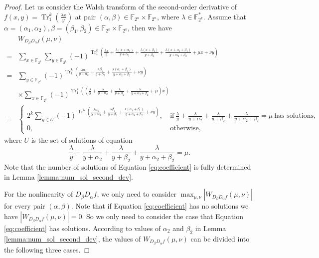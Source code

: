 \documentclass{article}
\newcommand{\F}{\mathbb{F}}
\newcommand{\0}{\textbf{0}}
\newcommand{\1}{\textbf{1}}
\newcommand{\TRACE}{\operatorname{Tr}_1^k}
\theoremstyle{plain}
\begin{document}
    \begin{proof}
        Let us consider the Walsh transform of the second-order derivative of $f(x,y)=\TRACE\left(\frac{\lambda x}{y}\right)$ at
        pair $(\alpha, \beta)\in\F_{2^n}\times\F_{2^n}$, where $\lambda\in\F_{2^k}^*$.
        Assume that $\alpha=(\alpha_1,\alpha_2),\beta=(\beta_1,\beta_2)\in\F_{2^k}\times\F_{2^k}$, then
        we have
        \begin{align*}\label{eq:secondordersum}
            &W_{D_{\beta}D_{\alpha}f}(\mu,\nu)\nonumber\\
            =&\sum_{x\in\F_{2^k}}\sum_{y\in\F_{2^k}}(-1)^{\TRACE\left(\frac{\lambda x}{y}+\frac{\lambda (x+\alpha_1)}{y+\alpha_2}+\frac{\lambda (x+\beta_1)}{y+\beta_2}+\frac{\lambda (x+\alpha_1+\beta_1)}{y+\alpha_2+\beta_2}+\mu x+\nu y\right)}\nonumber\\
            =&\sum_{y\in\F_{2^k}}(-1)^{\TRACE\left(\frac{\lambda\alpha_1}{y+\alpha_2}+\frac{\lambda\beta_1}{y+\beta_2}+\frac{\lambda(\alpha_1+\beta_1)}{y+\alpha_2+\beta_2}+\nu y\right)}\nonumber\\
            &\times \sum_{x\in\F_{2^k}}(-1)^{\TRACE\left(\left(\frac{\lambda}{y}+\frac{\lambda}{y+\alpha_2}+\frac{\lambda}{y+\beta_2}+\frac{\lambda}{y+\alpha_2+\beta_2}+\mu\right)x\right)}\nonumber\\
            =&\begin{cases}
                2^k\sum_{y\in U}(-1)^{\TRACE\left(\frac{\lambda\alpha_1}{y+\alpha_2}+\frac{\lambda\beta_1}{y+\beta_2}+\frac{\lambda(\alpha_1+\beta_1)}{y+\alpha_2+\beta_2}+\nu y\right)},&~\text{if}~\frac{\lambda}{y}+\frac{\lambda}{y+\alpha_2}+\frac{\lambda}{y+\beta_2}+\frac{\lambda}{y+\alpha_2+\beta_2}=\mu~\text{has solutions},\\
                0, &~\text{otherwise},
            \end{cases}
        \end{align*}
        where $U$ is the set of solutions of equation
        \begin{equation}\label{eq:coefficient}
            \frac{\lambda}{y}+\frac{\lambda}{y+\alpha_2}+\frac{\lambda}{y+\beta_2}+\frac{\lambda}{y+\alpha_2+\beta_2}=\mu.
        \end{equation}
        Note that the number of solutions of Equation \eqref{eq:coefficient} is fully determined in Lemma \ref{lemma:num_sol_second_dev}.

        For the nonlinearity of $D_{\beta}D_{\alpha}f$, we only need to consider $\max_{\mu,\nu}|W_{D_{\beta}D_{\alpha}f}(\mu,\nu)|$ for every pair $(\alpha,\beta)$.
        Note that if Equation \eqref{eq:coefficient} has no solutions we have $\left\lvert W_{D_{\beta}D_{\alpha}f}(\mu,\nu)\right\rvert=0$.
        So we only need to consider the case that Equation \eqref{eq:coefficient} has solutions.
        According to values of $\alpha_2$ and $\beta_2$ in Lemma \ref{lemma:num_sol_second_dev}, the values of $W_{D_{\beta}D_{\alpha}f}(\mu,\nu)$
        can be divided into the following three cases.


\end{proof}
\end{document}
